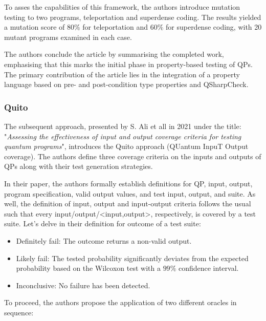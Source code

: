 \begin{itemize}
To asses the capabilities of this framework, the authors introduce mutation testing to two programs, teleportation and superdense coding. The results yielded a mutation score of $80\%$ for teleportation and $60\%$ for superdense coding, with 20 mutant programs examined in each case.\newline

The authors conclude the article by summarising the completed work, emphasising that this marks the initial phase in property-based testing of QPs. The primary contribution of the article lies in the integration of a property language based on pre- and post-condition type properties and QSharpCheck.


\vspace{15pt}
\subsubsection{Quito}
\label{Ch2.3.2:Quito}
 The subsequent approach, presented by S. Ali et all in 2021 under the title: "\textit{Assessing the effectiveness of input and output coverage criteria for testing quantum programs}"\cite{ali2021assessing}, introduces the Quito approach (QUantum InpuT Output coverage). The authors define three coverage criteria on the inputs and outputs of QPs along with their test generation strategies.\newline

In their paper, the authors formally establish definitions for QP, input, output, program specification, valid output values, and test input, output, and suite. As well, the definition of input, output and input-output criteria follows the usual such that every input/output/<input,output>, respectively,  is covered by a test suite. Let's delve in their definition for outcome of a test suite:

\vspace{8pt}
\begin{itemize}
    \item Definitely fail: The outcome returns a non-valid output.
    \item Likely fail: The tested probability significantly deviates from the expected probability based on the Wilcoxon test with a $99\%$ confidence interval.
    \item Inconclusive: No failure has been detected.
\end{itemize}

To proceed, the authors propose the application of two different oracles in sequence:


\end{itemize}
